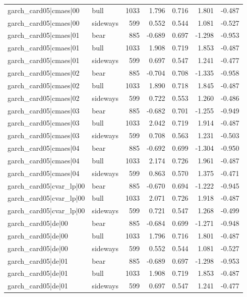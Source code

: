 \begin{table}
\begin{tabular}{llrrrrr}
garch\_card05|cmaes|00 & bull & 1033 & 1.796 & 0.716 & 1.801 & -0.487 \\
garch\_card05|cmaes|00 & sideways & 599 & 0.552 & 0.544 & 1.081 & -0.527 \\
garch\_card05|cmaes|01 & bear & 885 & -0.689 & 0.697 & -1.298 & -0.953 \\
garch\_card05|cmaes|01 & bull & 1033 & 1.908 & 0.719 & 1.853 & -0.487 \\
garch\_card05|cmaes|01 & sideways & 599 & 0.697 & 0.547 & 1.241 & -0.477 \\
garch\_card05|cmaes|02 & bear & 885 & -0.704 & 0.708 & -1.335 & -0.958 \\
garch\_card05|cmaes|02 & bull & 1033 & 1.890 & 0.718 & 1.845 & -0.487 \\
garch\_card05|cmaes|02 & sideways & 599 & 0.722 & 0.553 & 1.260 & -0.486 \\
garch\_card05|cmaes|03 & bear & 885 & -0.682 & 0.701 & -1.255 & -0.949 \\
garch\_card05|cmaes|03 & bull & 1033 & 2.042 & 0.719 & 1.914 & -0.487 \\
garch\_card05|cmaes|03 & sideways & 599 & 0.708 & 0.563 & 1.231 & -0.503 \\
garch\_card05|cmaes|04 & bear & 885 & -0.692 & 0.699 & -1.304 & -0.950 \\
garch\_card05|cmaes|04 & bull & 1033 & 2.174 & 0.726 & 1.961 & -0.487 \\
garch\_card05|cmaes|04 & sideways & 599 & 0.863 & 0.570 & 1.375 & -0.471 \\
garch\_card05|cvar\_lp|00 & bear & 885 & -0.670 & 0.694 & -1.222 & -0.945 \\
garch\_card05|cvar\_lp|00 & bull & 1033 & 2.071 & 0.726 & 1.918 & -0.487 \\
garch\_card05|cvar\_lp|00 & sideways & 599 & 0.721 & 0.547 & 1.268 & -0.499 \\
garch\_card05|de|00 & bear & 885 & -0.684 & 0.699 & -1.271 & -0.948 \\
garch\_card05|de|00 & bull & 1033 & 1.796 & 0.716 & 1.801 & -0.487 \\
garch\_card05|de|00 & sideways & 599 & 0.552 & 0.544 & 1.081 & -0.527 \\
garch\_card05|de|01 & bear & 885 & -0.689 & 0.697 & -1.298 & -0.953 \\
garch\_card05|de|01 & bull & 1033 & 1.908 & 0.719 & 1.853 & -0.487 \\
garch\_card05|de|01 & sideways & 599 & 0.697 & 0.547 & 1.241 & -0.477 \\

\end{tabular}
\end{table}
